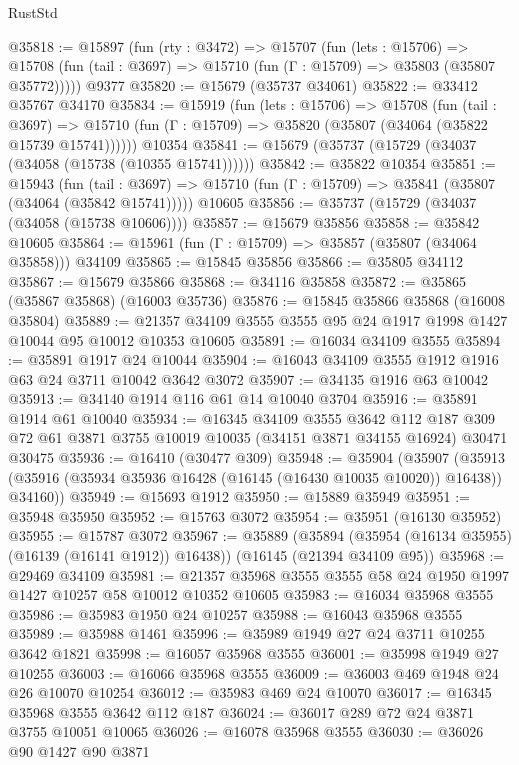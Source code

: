 \begin{lexlean}{RustStd}
\begin{coremodule}
@35818 := @15897
    (fun (rty : @3472) =>
    @15707
      (fun (lets : @15706) =>
      @15708 (fun (tail : @3697) => @15710 (fun (Γ : @15709) => @35803 (@35807 @35772)))))
    @9377
@35820 := @15679 (@35737 @34061)
@35822 := @33412 @35767 @34170
@35834 := @15919
    (fun (lets : @15706) =>
    @15708
      (fun (tail : @3697) =>
      @15710 (fun (Γ : @15709) => @35820 (@35807 (@34064 (@35822 @15739 @15741))))))
    @10354
@35841 := @15679 (@35737 (@15729 (@34037 (@34058 (@15738 (@10355 @15741))))))
@35842 := @35822 @10354
@35851 := @15943
    (fun (tail : @3697) => @15710 (fun (Γ : @15709) => @35841 (@35807 (@34064 (@35842 @15741)))))
    @10605
@35856 := @35737 (@15729 (@34037 (@34058 (@15738 @10606))))
@35857 := @15679 @35856
@35858 := @35842 @10605
@35864 := @15961 (fun (Γ : @15709) => @35857 (@35807 (@34064 @35858))) @34109
@35865 := @15845 @35856
@35866 := @35805 @34112
@35867 := @15679 @35866
@35868 := @34116 @35858
@35872 := @35865 (@35867 @35868) (@16003 @35736)
@35876 := @15845 @35866 @35868 (@16008 @35804)
@35889 := @21357 @34109 @3555 @3555 @95 @24 @1917 @1998 @1427 @10044 @95 @10012 @10353 @10605
@35891 := @16034 @34109 @3555
@35894 := @35891 @1917 @24 @10044
@35904 := @16043 @34109 @3555 @1912 @1916 @63 @24 @3711 @10042 @3642 @3072
@35907 := @34135 @1916 @63 @10042
@35913 := @34140 @1914 @116 @61 @14 @10040 @3704
@35916 := @35891 @1914 @61 @10040
@35934 := @16345
    @34109
    @3555
    @3642
    @112
    @187
    @309
    @72
    @61
    @3871
    @3755
    @10019
    @10035
    (@34151 @3871 @34155 @16924)
    @30471
    @30475
@35936 := @16410 (@30477 @309)
@35948 := @35904
    (@35907 (@35913 (@35916 (@35934 @35936 @16428 (@16145 (@16430 @10035 @10020)) @16438)) @34160))
@35949 := @15693 @1912
@35950 := @15889 @35949
@35951 := @35948 @35950
@35952 := @15763 @3072
@35954 := @35951 (@16130 @35952)
@35955 := @15787 @3072
@35967 := @35889
    (@35894 (@35954 (@16134 @35955) (@16139 (@16141 @1912)) @16438))
    (@16145 (@21394 @34109 @95))
@35968 := @29469 @34109
@35981 := @21357 @35968 @3555 @3555 @58 @24 @1950 @1997 @1427 @10257 @58 @10012 @10352 @10605
@35983 := @16034 @35968 @3555
@35986 := @35983 @1950 @24 @10257
@35988 := @16043 @35968 @3555
@35989 := @35988 @1461
@35996 := @35989 @1949 @27 @24 @3711 @10255 @3642 @1821
@35998 := @16057 @35968 @3555
@36001 := @35998 @1949 @27 @10255
@36003 := @16066 @35968 @3555
@36009 := @36003 @469 @1948 @24 @26 @10070 @10254
@36012 := @35983 @469 @24 @10070
@36017 := @16345 @35968 @3555 @3642 @112 @187
@36024 := @36017 @289 @72 @24 @3871 @3755 @10051 @10065
@36026 := @16078 @35968 @3555
@36030 := @36026 @90 @1427 @90 @3871

\end{coremodule}
\end{lexlean}
